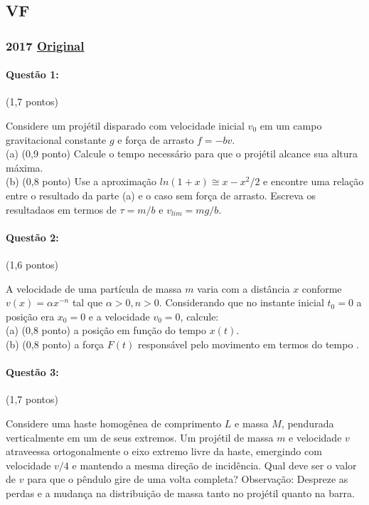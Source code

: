\documentclass[12pt,a4paper]{article}
\newcommand{\original}[1]{\tiny \href{#1}{Original} \normalsize}
\begin{document}
\newpage
\subsection{VF}
\subsubsection{2017 \original{https://drive.google.com/file/d/1UEfbFkB3rR6FdH4rFbYCLeYstSFjfIuX/view?usp=sharing}}


\paragraph{Questão 1:} (1,7 pontos) 

Considere um projétil disparado com velocidade inicial $v_0$ em um campo gravitacional constante $g$ e força de arrasto $f = -bv$.\\
(a) (0,9 ponto) Calcule o tempo necessário para que o projétil alcance sua altura máxima. \\
(b) (0,8 ponto) Use a aproximação $ln(1+x) \cong x-x^2/2$ e encontre uma relação entre o resultado da parte (a) e o caso sem força de arrasto. Escreva os resultadaos em termos de $ \tau = m/b $ e $v_{lim} = mg/b$.

\paragraph{Questão 2:} (1,6 pontos) 

A velocidade de uma partícula de massa $m$ varia com a distância $x$ conforme $v(x) = \alpha x^{-n}$ tal que $\alpha > 0, n>0$. Considerando que no instante inicial $t_0 = 0$ a posição era $x_0 = 0$ e a velocidade $v_0 = 0$, calcule:\\
(a) (0,8 ponto) a posição em função do tempo $x(t)$. \\
(b) (0,8 ponto) a força $F(t)$ responsável pelo movimento em termos do tempo . 

\paragraph{Questão 3:} (1,7 pontos) 

Considere uma haste homogênea de comprimento $L$ e massa $M$, pendurada verticalmente em um de seus extremos. Um projétil de massa $m$ e velocidade $v$ atraveessa ortogonalmente o eixo extremo livre da haste, emergindo com velocidade $v/4$ e mantendo a mesma direção de incidência. Qual deve ser o valor de $v$ para que o pêndulo gire de uma volta completa? Observação: Despreze as perdas e a mudança na distribuição de massa tanto no projétil quanto na barra.\\
\end{document}
